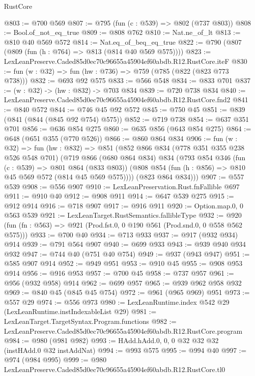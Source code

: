 \begin{lexlean}{RustCore}
\begin{coremodule}
@803 := @700 @569
@807 := @795 (fun (c : @539) => @802 (@737 @803))
@808 := Bool.of_not_eq_true
@809 := @808 @762
@810 := Nat.ne_of_lt
@813 := @810 @40 @569 @572
@814 := Nat.eq_of_beq_eq_true
@822 := @790 (@807 (@809 (fun (h : @764) => @813 (@814 @40 @569 @575))))
@823 := LexLeanPreserve.Caded85d0ec70c96655a45904ef60abdb.R12.RustCore.iteF
@830 := fun (w : @32) => fun (hw : @736) => @759 (@785 (@822 (@823 @773 @738)))
@832 := @693 @92 @575
@833 := @566 @548
@834 := @833 @701
@837 := (w : @32) -> (hw : @832) -> @703 @834
@839 := @720 @738 @834
@840 := LexLeanPreserve.Caded85d0ec70c96655a45904ef60abdb.R12.RustCore.fnd2
@841 := @840 @572
@844 := @746 @45 @92 @572
@845 := @750 @45
@851 := @839 (@841 (@844 (@845 @92 @754) @575))
@852 := @719 @738
@854 := @637 @351 @701
@856 := @636 @854 @275
@860 := @635 @856 (@643 @854 @275)
@864 := @648 (@651 @355 (@770 @526))
@866 := @860 @864 @834
@906 := fun (w : @32) =>
  fun (hw : @832) =>
  @851
    (@852
      @866
      @834
      (@778 @351 @355 @238 @526 @548 @701)
      (@719
        @866
        (@680 @864 @834)
        @834
        (@793
          @854
          @346
          (fun (c : @539) => @801 @864 (@833 @803))
          (@808 @854 (fun (h : @856) => @810 @45 @569 @572 (@814 @45 @569 @575))))
        (@823 @864 @834)))
@907 := @557 @539
@908 := @556 @907
@910 := LexLeanPreservation.Rust.fnFallible @697
@911 := @910 @40
@912 := @908 @911
@914 := @647 @539 @275
@915 := @912 @914
@916 := @718 @907
@917 := @916 @911
@920 := Option.map.{0, 0} @563 @539
@921 := LexLeanTarget.RustSemantics.fallibleType
@932 := @920 (fun (fn : @563) => @921 (Prod.fst.{0, 0} @190 @561 (Prod.snd.{0, 0} @558 @562 @575)))
@933 := @700 @40
@934 := @713 @933
@937 := @917 (@932 @934) @914
@939 := @791 @564 @907
@940 := @699 @933
@943 := @939 @940 @934 @932
@947 := @744 @40 (@751 @40 @754)
@949 := @937 (@943 @947)
@951 := @585 @907 @914
@952 := @949 @951
@953 := @910 @45
@955 := @908 @953 @914
@956 := @916 @953
@957 := @700 @45
@958 := @737 @957
@961 := @956 (@932 @958) @914
@962 := @699 @957
@965 := @939 @962 @958 @932
@969 := @840 @45 (@845 @45 @754)
@972 := @961 (@965 @969) @951
@973 := @557 @29
@974 := @556 @973
@980 := LexLeanRuntime.index @542 @29 (LexLeanRuntime.instIndexableList @29)
@981 := LexLeanTarget.TargetSyntax.Program.functions
@982 := LexLeanPreserve.Caded85d0ec70c96655a45904ef60abdb.R12.RustCore.program
@984 := @980 (@981 @982)
@993 := HAdd.hAdd.{0, 0, 0} @32 @32 @32 (instHAdd.{0} @32 instAddNat)
@994 := @993 @575
@995 := @994 @40
@997 := @974 (@984 @995)
@999 := @980 LexLeanPreserve.Caded85d0ec70c96655a45904ef60abdb.R12.RustCore.tl0

\end{coremodule}
\end{lexlean}
